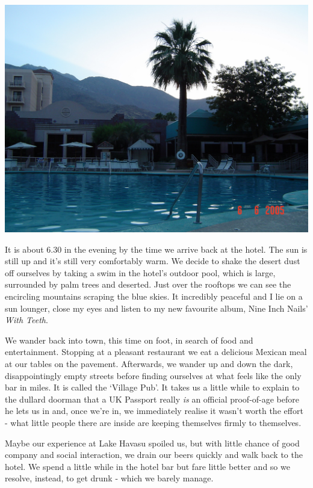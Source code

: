 \documentclass[a5paper,titlepage,11pt]{book}
\begin{document}
\begin{center}\includegraphics[width=\textwidth]{gfx/palmsprings_pool}\end{center}

It is about 6.30 in the evening by the time we arrive back at the hotel.  The sun is still up and it's still very comfortably warm.  We decide to shake the desert dust off ourselves by taking a swim in the hotel's outdoor pool, which is large, surrounded by palm trees and deserted.  Just over the rooftops we can see the encircling mountains scraping the blue skies.  It incredibly peaceful and I lie on a sun lounger, close my eyes and listen to my new favourite album, Nine Inch Nails' \emph{With Teeth}.

We wander back into town, this time on foot, in search of food and entertainment.  Stopping at a pleasant restaurant we eat a delicious Mexican meal at our tables on the pavement.  Afterwards, we wander up and down the dark, disappointingly empty streets before finding ourselves at what feels like the only bar in miles.  It is called the `Village Pub'.  It takes us a little while to explain to the dullard doorman that a UK Passport really \emph{is} an official proof-of-age before he lets us in and, once we're in, we immediately realise it wasn't worth the effort - what little people there are inside are keeping themselves firmly to themselves.

Maybe our experience at Lake Havasu spoiled us, but with little chance of good company and social interaction, we drain our beers quickly and walk back to the hotel.  We spend a little while in the hotel bar but fare little better and so we resolve, instead, to get drunk - which we barely manage.
\end{document}
